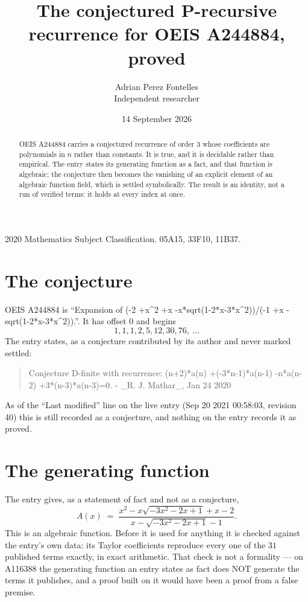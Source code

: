 \documentclass[11pt,a4paper]{article}
\title{The conjectured P-recursive recurrence for OEIS A244884, proved}
\author{Adrian Perez Fontelles\\ \small Independent researcher}
\date{14 September 2026}
\theoremstyle{plain}
\theoremstyle{definition}
\begin{document}
\maketitle

\begin{abstract}
OEIS A244884 carries a conjectured recurrence of order $3$ whose coefficients are polynomials in
$n$ rather than constants. It is true, and it is decidable rather than empirical. The entry
states its generating function as a fact, and that function is algebraic; the conjecture then
becomes the vanishing of an explicit element of an algebraic function field, which is settled
symbolically. The result is an identity, not a run of verified terms: it holds at every index
at once.
\end{abstract}

\noindent\small 2020 Mathematics Subject Classification. 05A15, 33F10, 11B37.\normalsize

\section{The conjecture}

OEIS A244884 is ``Expansion of (-2 +x\^{}2 +x -x*sqrt(1-2*x-3*x\^{}2))/(-1 +x -sqrt(1-2*x-3*x\^{}2)).''. It has offset $0$ and begins
\[
1, 1, 1, 2, 5, 12, 30, 76,\ \dots
\]
The entry states, as a conjecture contributed by its author and never marked settled:
\begin{quote}\raggedright\small
Conjecture D-finite with recurrence: (n+2)*a(n) +(-3*n-1)*a(n-1) -n*a(n-2) +3*(n-3)*a(n-3)=0. - \_R. J. Mathar\_, Jan 24 2020
\end{quote}
As of the ``Last modified'' line on the live entry (Sep 20 2021 00:58:03, revision 40)
this is still recorded as a conjecture, and nothing on the entry records it as proved.

\section{The generating function}

The entry gives, as a statement of fact and not as a conjecture,
\[
A(x)\;=\;\frac{x^{2} - x \sqrt{- 3 x^{2} - 2 x + 1} + x - 2}{x - \sqrt{- 3 x^{2} - 2 x + 1} - 1} .
\]
This is an algebraic function. Before it is used for anything it is checked against the entry's
own data: its Taylor coefficients reproduce every one of the $31$ published terms
exactly, in exact arithmetic. That check is not a formality --- on A116388 the generating
function an entry states as fact does NOT generate the terms it publishes, and a proof built on
it would have been a proof from a false premise.
\end{document}

